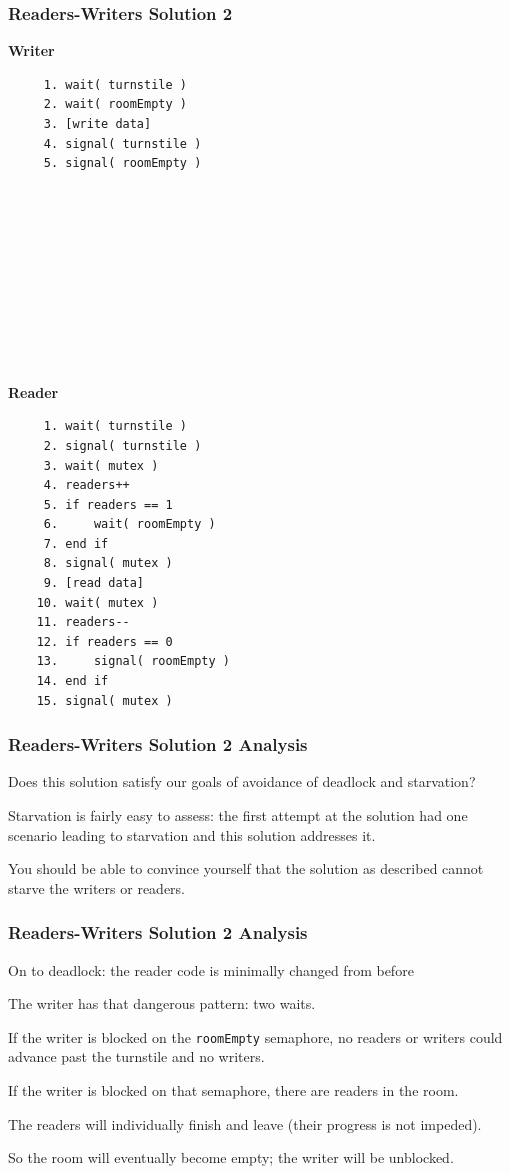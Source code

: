 \begin{frame}[fragile]
	\frametitle{Readers-Writers Solution 2}
	\begin{multicols}{2}
		\textbf{Writer}
		\begin{verbatim}
	 1. wait( turnstile )
	 2. wait( roomEmpty )
	 3. [write data]
	 4. signal( turnstile )
	 5. signal( roomEmpty )
	 
	 
	 
	 
	 
	 
	 
	 
	 
	 
  \end{verbatim}
		\columnbreak
		\textbf{Reader}
		\begin{verbatim}
	 1. wait( turnstile )
	 2. signal( turnstile )
	 3. wait( mutex )
	 4. readers++
	 5. if readers == 1
	 6.     wait( roomEmpty )
	 7. end if
	 8. signal( mutex )
	 9. [read data]
	10. wait( mutex )
	11. readers--
	12. if readers == 0
	13.     signal( roomEmpty )
	14. end if
	15. signal( mutex )
  \end{verbatim}
	\end{multicols}

\end{frame}


\begin{frame}
	\frametitle{Readers-Writers Solution 2 Analysis}

	Does this solution satisfy our goals of avoidance of deadlock and starvation?

	Starvation is fairly easy to assess: the first attempt at the solution had one scenario leading to starvation and this solution addresses it.

	You should be able to convince yourself that the solution as described cannot starve the writers or readers.


\end{frame}


\begin{frame}
	\frametitle{Readers-Writers Solution 2 Analysis}

	On to deadlock: the reader code is minimally changed from before

	The writer has that dangerous pattern: two waits.

	If the writer is blocked on the \texttt{roomEmpty} semaphore, no readers or writers could advance past the turnstile and no writers.

	If the writer is blocked on that semaphore, there are readers in the room.

	The readers will individually finish and leave (their progress is not impeded).

	So the room will eventually become empty; the writer will be unblocked.


\end{frame}

